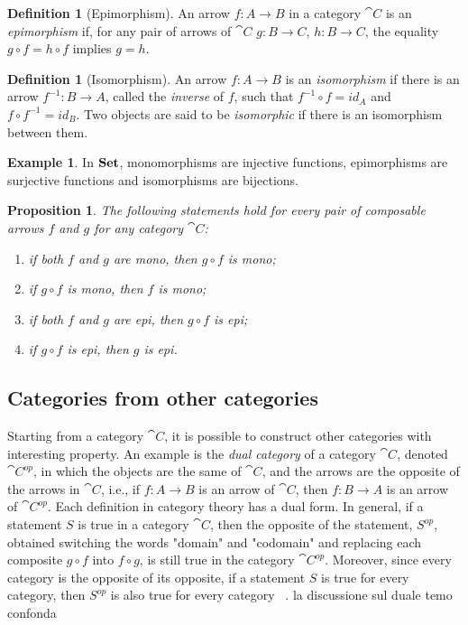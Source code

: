 \documentclass[a4paper, twoside,openright]{report}
\theoremstyle{plain}
\newtheorem{prop}[theorem]{Proposition}
\theoremstyle{definition}
\newtheorem{definition}[theorem]{Definition}
\newtheorem{example}[theorem]{Example}
\begin{document}
\begin{definition}[Epimorphism]\label{def:epi}
    An arrow $f: A\rightarrow B$ in a category $\cat{C}$ is an \emph{epimorphism} if, for any pair of arrows of $\cat{C}$ $g : B \rightarrow C$, $h: B \rightarrow C$, the equality $g \circ f = h \circ f$ implies $g = h$.
\end{definition}

\begin{definition}[Isomorphism]\label{def:iso}
    An arrow $f:A \rightarrow B$ is an \emph{isomorphism} if there is an arrow $f^{-1}:B \rightarrow A$, called the \emph{inverse} of $f$, such that $f^{-1}\circ f = id_{A}$ and $f \circ f^{-1} = id_{B}$. Two objects are said to be \emph{isomorphic} if there is an isomorphism between them.
\end{definition}

\begin{example}
    In $\mathbf{Set}$, monomorphisms are injective functions, epimorphisms are surjective functions and isomorphisms are bijections.
\end{example}

\begin{prop}\label{prop:epi_mono_prop}
    The following statements hold for every pair of composable arrows $f$ and $g$ for any category $\cat C$:
    \begin{enumerate}
        \item if both $f$ and $g$ are mono, then $g \circ f$ is mono;
        \item if $g \circ f$ is mono, then $f$ is mono;
        \item if both $f$ and $g$ are epi, then $g \circ f$ is epi;
        \item if $g \circ f$ is epi, then $g$ is epi.
    \end{enumerate}
\end{prop}

\subsection{Categories from other categories}\label{ssect:cats_from_cats}

Starting from a category $\cat{C}$, it is possible to construct other categories with interesting property.
An example is the \emph{dual category} of a category $\cat{C}$, denoted $\cat{C}^{op}$, in which the objects are the same of $\cat{C}$, and the arrows are the opposite of the arrows in $\cat{C}$, i.e., if $f: A \rightarrow B$ is an arrow of $\cat{C}$, then $f: B \rightarrow A$ is an arrow of $\cat{C}^{op}$.
Each definition in category theory has a dual form. In general, if a statement $S$ is true in a category $\cat{C}$, then the opposite of the statement, $S^{op}$, obtained switching the words "domain" and "codomain" and replacing each composite $g \circ f$ into $f \circ g$, is still true in the category $\cat{C}^{op}$. Moreover, since every category is the opposite of its opposite, if a statement $S$ is true for every category, then $S^{op}$ is also true for every category ~\cite[pp8-9]{pierce91}. {\color{red} la discussione sul duale temo confonda}
\end{document}
